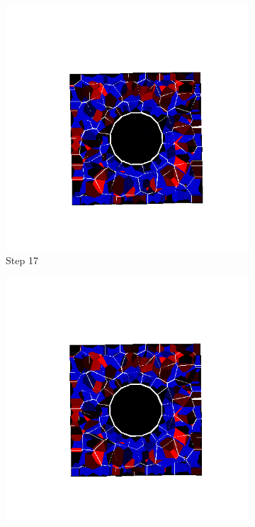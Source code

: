 \begin{figure}[ht!]
      \begin{subfigure}{.25\textwidth}
        \centering
        \includegraphics[width=1.0\linewidth]{Files/Small_DEF/IS/DEP5-STEP(017).png}
      \caption{Step 17}
      \end{subfigure}%
      \begin{subfigure}{.25\textwidth}
        \centering
        \includegraphics[width=1.0\linewidth]{Files/Small_DEF/IS/DEP5-STEP(018).png}

\end{subfigure}
\end{figure}
